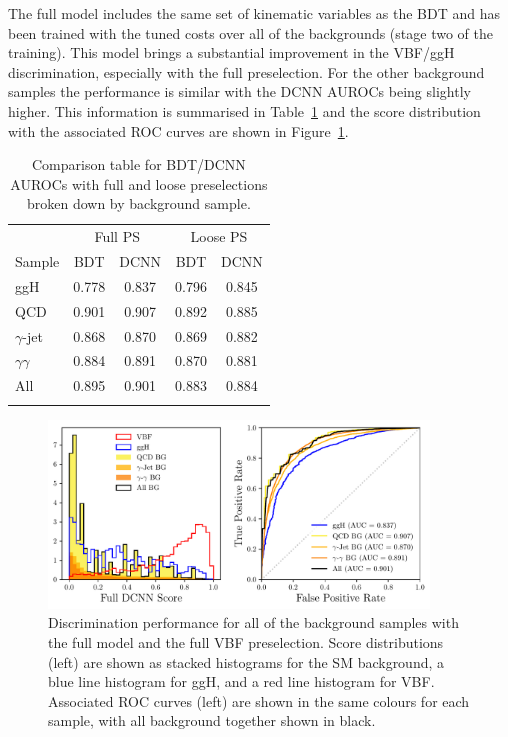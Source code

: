 The full model includes the same set of kinematic variables as the BDT and has been trained with the tuned costs over all of the backgrounds (stage two of the training).
This model brings a substantial improvement in the VBF/ggH discrimination, especially with the full preselection. 
For the other background samples the performance is similar with the DCNN AUROCs being slightly higher. 
This information is summarised in Table~\ref{tab:event_categorisation:auroc_table} and the score distribution with the associated ROC curves are shown in Figure~\ref{fig:event_categorisation:perf_full_DCNN}.
\begin{table}[h!]
    \centering
    \renewcommand{\arraystretch}{1.3}
    \begin{tabular}{l|cccc}
        \thickhline
        & \multicolumn{2}{c}{Full PS} & \multicolumn{2}{c}{Loose PS} \\ 
        Sample & BDT & DCNN & BDT & DCNN \\
        \hline
        ggH             & 0.778 & 0.837 & 0.796 & 0.845\\
        QCD             & 0.901 & 0.907 & 0.892 & 0.885\\
        $\gamma$-jet    & 0.868 & 0.870 & 0.869 & 0.882\\
        $\gamma\gamma$  & 0.884 & 0.891 & 0.870 & 0.881\\
        All             & 0.895 & 0.901 & 0.883 & 0.884\\
        \thickhline
    \end{tabular}
    \caption{Comparison table for BDT/DCNN AUROCs with full and loose preselections broken down by background sample.}
    \label{tab:event_categorisation:auroc_table}
\end{table}
\begin{figure}[h!]
    \centering
    \includegraphics[width=0.9\textwidth]{figures/event_selection/full_DCNN_PS.pdf}
    \caption{Discrimination performance for all of the background samples with the full model and the full VBF preselection.
             Score distributions (left) are shown as stacked histograms for the SM background, a blue line histogram for ggH, and a red line histogram for VBF. 
             Associated ROC curves (left) are shown in the same colours for each sample, with all background together shown in black.}
    \label{fig:event_categorisation:perf_full_DCNN}
\end{figure}

